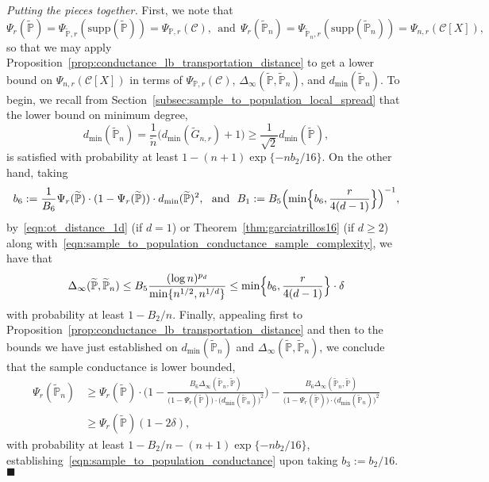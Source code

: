 \documentclass[twoside,11pt]{article}
\newcommand{\1}{\mathbf{1}}
\newcommand{\mc}[1]{\mathcal{#1}}
\newcommand{\mbb}[1]{\mathbb{#1}}
\newcommand{\Pbb}{\mathbb{P}}
\newcommand{\wt}[1]{\widetilde{#1}}
\newcommand{\qed}{\hfill $\blacksquare$}
\begin{document}
\noindent \emph{Putting the pieces together.} 
First, we note that
\begin{equation*}
\Psi_r(\wt{\mbb{P}}) = \Psi_{\wt{\mbb{P}},r}(\mathrm{supp}(\wt{\mbb{P}})) = \Psi_{\Pbb,r}(\mc{C}), ~~\textrm{and}~~\Psi_{r}(\wt{\mbb{P}}_n) = \Psi_{\wt{\mbb{P}}_n, r}(\mathrm{supp}(\wt{\mbb{P}}_n)) = \Psi_{n,r}(\mc{C}[X]),
\end{equation*}
so that we may apply Proposition~\ref{prop:conductance_lb_transportation_distance} to get a lower bound on $\Psi_{n,r}(\mc{C}[X])$ in terms of $\Psi_{\Pbb,r}(\mc{C})$, $\Delta_{\infty}(\wt{\Pbb}, \wt{\Pbb}_n)$, and $d_{\min}(\wt{\Pbb}_{n})$. To begin, we recall from Section~\ref{subsec:sample_to_population_local_spread} that the lower bound on minimum degree,
\begin{equation*}
d_{\min}(\wt{\Pbb}_n) = \frac{1}{\wt{n}} \bigl(d_{\min}(\wt{G}_{n,r}) + 1\bigr) \geq \frac{1}{\sqrt{2}} d_{\min}(\wt{\Pbb}),
\end{equation*}
is satisfied with probability at least $1 - (n + 1)\exp\{-nb_2/16\}$. On the other hand, taking
\begin{equation*}
b_6 := \frac{1}{B_6}\Psi_r(\wt{\Pbb}) \cdot (1 - \Psi_r(\wt{\Pbb})) \cdot d_{\min}(\wt{\Pbb})^2,~~\textrm{and}~~ B_1 := B_5 \Bigl(\min\Bigl\{b_6, \frac{r}{4(d - 1)} \Bigr\}\Bigr)^{-1},
\end{equation*}
by~\eqref{eqn:ot_distance_1d} (if $d = 1$) or Theorem~\ref{thm:garciatrillos16} (if $d \geq 2$) along with~\eqref{eqn:sample_to_population_conductance_sample_complexity}, we have that
\begin{equation*}
\Delta_{\infty}(\wt{\Pbb},\wt{\Pbb}_n) \leq B_5 \frac{(\log n)^{p_d}}{\min\{n^{1/2},n^{1/d}\}} \leq \min\Bigl\{b_6, \frac{r}{4(d - 1)} \Bigr\} \cdot \delta
\end{equation*}
with probability at least $1 - B_2/n$. Finally, appealing first to  Proposition~\ref{prop:conductance_lb_transportation_distance} and then to the bounds we have just established on $d_{\min}(\wt{\Pbb}_n)$ and $\Delta_{\infty}(\wt{\Pbb},\wt{\Pbb}_n)$, we conclude that the sample conductance is lower bounded,
\begin{align*}
\Psi_r(\wt{\Pbb}_n) & \geq \Psi_r(\wt{\Pbb}) \cdot \biggl(1 - \frac{B_6\Delta_{\infty}(\wt{\Pbb}_n,\wt{\Pbb})}{\bigl(1 - \Psi_r(\wt{\Pbb})\bigr) \cdot \bigl(d_{\min}(\wt{\Pbb}_n)\bigr)^2}\biggr) - \frac{B_6 \Delta_{\infty}(\wt{\Pbb}_n,\wt{\Pbb})}{\bigl(1 - \Psi_r(\wt{\Pbb})\bigr) \cdot \bigl(d_{\min}(\wt{\Pbb}_n)\bigr)^2} \\
& \geq \Psi_r(\wt{\Pbb}) (1 - 2\delta),
\end{align*}
with probability at least $1 - B_2/n - (n + 1)\exp\{-nb_2/16\}$, establishing~\eqref{eqn:sample_to_population_conductance} upon taking $b_3 := b_2/16$. \qed
\end{document}
